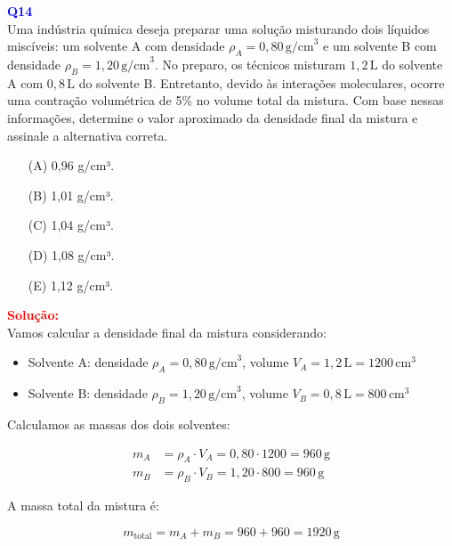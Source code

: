 \documentclass[a4paper,12pt]{article}
\begin{document}
\begin{flushleft}
\textbf{\textcolor{blue}{\Large Q14}}\\

Uma indústria química deseja preparar uma solução misturando dois líquidos miscíveis: um solvente A 
com densidade \( \rho_A = 0{,}80\,\text{g/cm}^3 \) e um solvente B com densidade \( \rho_B = 1{,}20\,\text{g/cm}^3 \).
No preparo, os técnicos misturam \(1{,}2\,\text{L}\) do solvente A com \(0{,}8\,\text{L}\) do solvente B. 
Entretanto, devido às interações moleculares, ocorre uma contração volumétrica de 5\% no volume total da mistura.
Com base nessas informações, determine o valor aproximado da densidade final da mistura e assinale a alternativa correta.


\begin{itemize}
\item[(A)] 0,96 g/cm³.
\item[(B)] 1,01 g/cm³.
\item[(C)] 1,04 g/cm³.
\item[(D)] 1,08 g/cm³.
\item[(E)] 1,12 g/cm³.
\end{itemize}

\vspace{0.5cm}

\textcolor{red}{\textbf{Solução:}}\\

\noindent
Vamos calcular a densidade final da mistura considerando:

\begin{itemize}
  \item Solvente A: densidade \( \rho_A = 0{,}80\,\text{g/cm}^3 \), volume \( V_A = 1{,}2\,\text{L} = 1200\,\text{cm}^3 \)
  \item Solvente B: densidade \( \rho_B = 1{,}20\,\text{g/cm}^3 \), volume \( V_B = 0{,}8\,\text{L} = 800\,\text{cm}^3 \)
\end{itemize}

\noindent
Calculamos as massas dos dois solventes:

\begin{align*}
m_A &= \rho_A \cdot V_A = 0{,}80 \cdot 1200 = 960\,\text{g} \\
m_B &= \rho_B \cdot V_B = 1{,}20 \cdot 800 = 960\,\text{g}
\end{align*}

\noindent
A massa total da mistura é:

\[
m_{\text{total}} = m_A + m_B = 960 + 960 = 1920\,\text{g}
\]


\end{flushleft}
\end{document}
